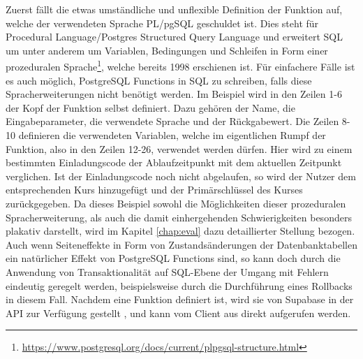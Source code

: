 \noindent Zuerst fällt die etwas umständliche und unflexible Definition der Funktion auf, welche der verwendeten Sprache PL/pgSQL geschuldet ist. Dies steht für Procedural Language/Postgres Structured Query Language und erweitert SQL um unter anderem um Variablen, Bedingungen und Schleifen in Form einer prozeduralen Sprache\footnote{\url{https://www.postgresql.org/docs/current/plpgsql-structure.html}}, welche bereits 1998 erschienen ist. Für einfachere Fälle ist es auch möglich, PostgreSQL Functions in SQL zu schreiben, falls diese Spracherweiterungen nicht benötigt werden. Im Beispiel wird in den Zeilen 1-6 der Kopf der Funktion selbst definiert. Dazu gehören der Name, die Eingabeparameter, die verwendete Sprache und der Rückgabewert. Die Zeilen 8-10 definieren die verwendeten Variablen, welche im eigentlichen Rumpf der Funktion, also in den Zeilen 12-26, verwendet werden dürfen. Hier wird zu einem bestimmten Einladungscode der Ablaufzeitpunkt mit dem aktuellen Zeitpunkt verglichen. Ist der Einladungscode noch nicht abgelaufen, so wird der Nutzer dem entsprechenden Kurs hinzugefügt und der Primärschlüssel des Kurses zurückgegeben. Da dieses Beispiel sowohl die Möglichkeiten dieser prozeduralen Spracherweiterung, als auch die damit einhergehenden Schwierigkeiten besonders plakativ darstellt, wird im Kapitel \ref{chap:eval} dazu detaillierter Stellung bezogen. Auch wenn Seiteneffekte in Form von Zustandsänderungen der Datenbanktabellen ein natürlicher Effekt von PostgreSQL Functions sind, so kann doch durch die Anwendung von Transaktionalität auf SQL-Ebene der Umgang mit Fehlern eindeutig geregelt werden, beispielsweise durch die Durchführung eines Rollbacks in diesem Fall. Nachdem eine Funktion definiert ist, wird sie von Supabase in der API zur Verfügung gestellt \cite[vgl.][]{SupabaseFunctions}, und kann vom Client aus direkt aufgerufen werden.
